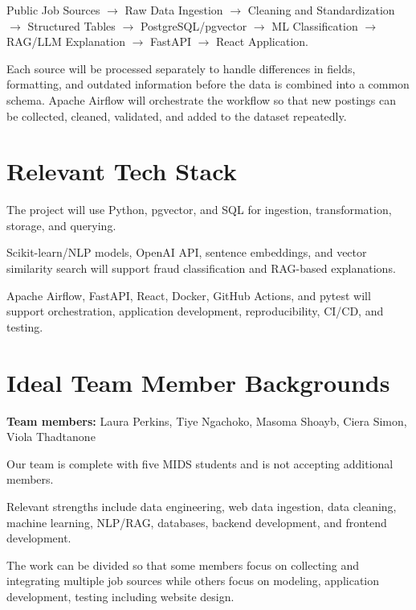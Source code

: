 \documentclass{article}
\begin{document}
Public Job Sources $\rightarrow$ Raw Data Ingestion $\rightarrow$ Cleaning and Standardization $\rightarrow$ Structured Tables 
$\rightarrow$ PostgreSQL/pgvector $\rightarrow$ ML Classification $\rightarrow$ RAG/LLM Explanation
$\rightarrow$ FastAPI $\rightarrow$ React Application.

Each source will be processed separately to handle differences in fields, formatting, and 
outdated information before the data is combined into a common schema. Apache Airflow will orchestrate 
the workflow so that new postings can be collected, cleaned, validated, and added to the dataset repeatedly.

\section{Relevant Tech Stack}

The project will use Python, pgvector, and SQL for ingestion, transformation, storage, and querying.

Scikit-learn/NLP models, OpenAI API, sentence embeddings, and vector similarity search will 
support fraud classification and RAG-based explanations.

Apache Airflow, FastAPI, React, Docker, GitHub Actions, and pytest will support orchestration, 
application development, reproducibility, CI/CD, and testing.

\section{Ideal Team Member Backgrounds}

\textbf{Team members:} Laura Perkins, Tiye Ngachoko, Masoma Shoayb, Ciera Simon, Viola Thadtanone

Our team is complete with five MIDS students and is not accepting additional members.

Relevant strengths include data engineering, web data ingestion, data cleaning, machine learning, 
NLP/RAG, databases, backend development, and frontend development.

The work can be divided so that some members focus on collecting and integrating multiple job 
sources while others focus on modeling, application development, testing including website design.
\end{document}
